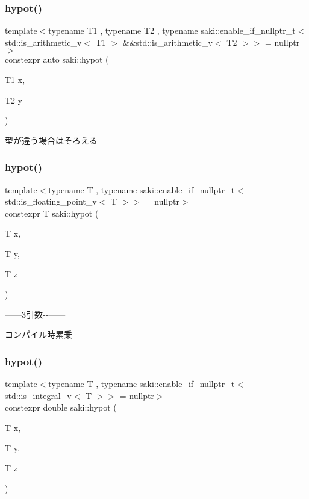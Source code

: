 \subsubsection{\texorpdfstring{hypot()}{hypot()}\hspace{0.1cm}{\footnotesize\ttfamily [3/6]}}
{\footnotesize\ttfamily template$<$typename T1 , typename T2 , typename saki\+::enable\+\_\+if\+\_\+nullptr\+\_\+t$<$ std\+::is\+\_\+arithmetic\+\_\+v$<$ T1 $>$ \&\&std\+::is\+\_\+arithmetic\+\_\+v$<$ T2 $>$$>$  = nullptr$>$ \\
constexpr auto saki\+::hypot (\begin{DoxyParamCaption}\item[{T1}]{x,  }\item[{T2}]{y }\end{DoxyParamCaption})}



型が違う場合はそろえる 

\mbox{\label{namespacesaki_a56768ecf1270205a8c9b3ac8cdf4a590}} 
\subsubsection{\texorpdfstring{hypot()}{hypot()}\hspace{0.1cm}{\footnotesize\ttfamily [4/6]}}
{\footnotesize\ttfamily template$<$typename T , typename saki\+::enable\+\_\+if\+\_\+nullptr\+\_\+t$<$ std\+::is\+\_\+floating\+\_\+point\+\_\+v$<$ T $>$$>$  = nullptr$>$ \\
constexpr T saki\+::hypot (\begin{DoxyParamCaption}\item[{T}]{x,  }\item[{T}]{y,  }\item[{T}]{z }\end{DoxyParamCaption})}



------3引数-\/-\/------ 

コンパイル時累乗 \mbox{\label{namespacesaki_ad56e1232bb063b3bc0e7cf2b3f655247}} 
\subsubsection{\texorpdfstring{hypot()}{hypot()}\hspace{0.1cm}{\footnotesize\ttfamily [5/6]}}
{\footnotesize\ttfamily template$<$typename T , typename saki\+::enable\+\_\+if\+\_\+nullptr\+\_\+t$<$ std\+::is\+\_\+integral\+\_\+v$<$ T $>$$>$  = nullptr$>$ \\
constexpr double saki\+::hypot (\begin{DoxyParamCaption}\item[{T}]{x,  }\item[{T}]{y,  }\item[{T}]{z }\end{DoxyParamCaption})}



